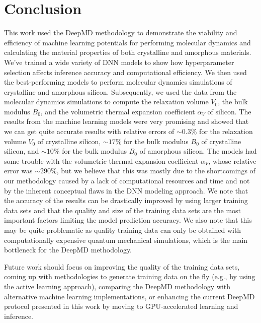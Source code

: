 \chapter{Conclusion}

This work used the DeepMD methodology to demonstrate the viability and
efficiency of machine learning potentials for performing molecular dynamics
and calculating the material properties of both crystalline and amorphous
materials. We've trained a wide variety of DNN models to show how
hyperparameter selection affects inference accuracy and computational
efficiency. We then used the best-performing models to perform molecular
dynamics simulations of crystalline and amorphous silicon. Subsequently, we
used the data from the molecular dynamics simulations to compute the
relaxation volume $V_0$, the bulk modulus $B_0$, and the volumetric thermal
expansion coefficient $\alpha_V$ of silicon. The results from the machine
learning models were very promising and showed that we can get quite accurate
results with relative errors of $\sim 0.3\%$ for the relaxation volume $V_0$
of crystalline silicon, $\sim 17 \%$ for the bulk modulus $B_0$ of crystalline
silicon, and $\sim 10 \%$ for the bulk modulus $B_0$ of amorphous silicon. The
models had some trouble with the volumetric thermal expansion coefficient
$\alpha_V$, whose relative error was $\sim 290 \%$, but we believe that this
was mostly due to the shortcomings of our methodology caused by a lack of
computational resources and time and not by the inherent conceptual flaws in
the DNN modeling approach. We note that the accuracy of the results can be
drastically improved by using larger training data sets and that the quality
and size of the training data sets are the most important factors limiting the
model prediction accuracy. We also note that this may be quite problematic as
quality training data can only be obtained with computationally expensive
quantum mechanical simulations, which is the main bottleneck for the DeepMD
methodology.

Future work should focus on improving the quality of the training data sets,
coming up with methodologies to generate training data on the fly (e.g., by
using the active learning approach), comparing the DeepMD methodology with
alternative machine learning implementations, or enhancing the current DeepMD
protocol presented in this work by moving to GPU-accelerated learning and
inference.
